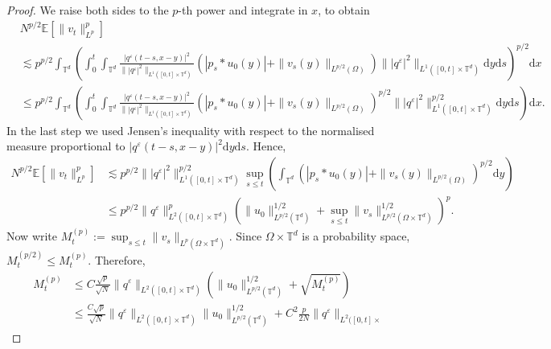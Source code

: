 \documentclass[a4paper,12pt]{article}
\newcommand{\assign}{:=}
\newcommand{\mathd}{\mathrm{d}}
\begin{document}
\begin{proof}
  We raise both
  sides to the $p$-th power and integrate in $x$, to obtain
  \begin{align*}
    & N^{p / 2} \mathbb{E} [\| v_t \|_{L^p}^p] \\
    & \lesssim p^{p / 2} \int_{\mathbb{T}^d} \left( \int_0^t
    \int_{\mathbb{T}^d} \frac{| q^{\varepsilon} (t - s, x - y) |^2}{\| |
    q^{\varepsilon} |^2 \|_{L^1 ([0, t] \times \mathbb{T}^d)}} (| p_s \ast u_0
    (y) | + \| v_s (y) \|_{L^{p / 2} (\Omega)}) \| | q^{\varepsilon} |^2
    \|_{L^1 ([0, t] \times \mathbb{T}^d)} \mathd y \mathd s \right)^{p / 2}
    \mathd x\\
    & \leq p^{p / 2} \int_{\mathbb{T}^d} \left( \int_0^t
    \int_{\mathbb{T}^d} \frac{| q^{\varepsilon} (t - s, x - y) |^2}{\| |
    q^{\varepsilon} |^2 \|_{L^1 ([0, t] \times \mathbb{T}^d)}} (| p_s \ast u_0
    (y) | + \| v_s (y) \|_{L^{p / 2} (\Omega)})^{p / 2} \| | q^{\varepsilon}
    |^2 \|_{L^1 ([0, t] \times \mathbb{T}^d)}^{p / 2} \mathd y \mathd s
    \right) \mathd x .
 \end{align*}
In the last step we used Jensen's inequality with respect to the normalised measure proportional to $| q^{\varepsilon} (t - s, x - y) |^2\mathd y \mathd s$. Hence, 
    \begin{align*}
     N^{p / 2} \mathbb{E} [\| v_t \|_{L^p}^p]
     & \lesssim p^{p / 2} \| | q^{\varepsilon} |^2 \|_{L^1 ([0, t] \times
    \mathbb{T}^d)}^{p / 2} \sup_{s \leq t} \left( \int_{\mathbb{T}^d} (|
    p_s \ast u_0 (y) | + \| v_s (y) \|_{L^{p / 2} (\Omega)})^{p / 2} \mathd y
    \right)\\
    & \leq p^{p / 2} \| q^{\varepsilon} \|_{L^2 ([0, t] \times
    \mathbb{T}^d)}^p (\| u_0 \|_{L^{p / 2} (\mathbb{T}^d)}^{1 / 2} + \sup_{s
    \leq t} \| v_s \|_{L^{p / 2} (\Omega \times \mathbb{T}^d)}^{1 / 2})^p.
  \end{align*} 
  Now write $M_t^{(p)} \assign \sup_{s \leq t} \| v_s \|_{L^p (\Omega \times
     \mathbb{T}^d)}$. Since $\Omega \times \mathbb{T}^d$  is a probability space, $M_t^{(p / 2)} \leq M_t^{(p)}$. Therefore,
  \begin{align*}
    M^{(p)}_t & \leq C \frac{\sqrt{p}}{\sqrt{N}} \| q^{\varepsilon}
    \|_{L^2 ([0, t] \times \mathbb{T}^d)} \left( \| u_0 \|_{L^{p / 2}
    (\mathbb{T}^d)}^{1 / 2} + \sqrt{M^{(p)}_t} \right)\\
    & \leq \frac{C \sqrt{p}}{\sqrt{N}} \| q^{\varepsilon} \|_{L^2 ([0,
    t] \times \mathbb{T}^d)} \| u_0 \|_{L^{p / 2} (\mathbb{T}^d)}^{1 / 2} +
    C^2 \frac{p}{2 N} \| q^{\varepsilon} \|_{L^2 ([0, t] \times
}
\end{align*}
\end{proof}
\end{document}
